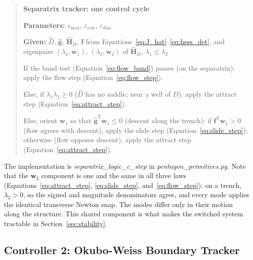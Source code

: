 \documentclass[12pt, letterpaper, oneside]{report}
\begin{document}
\begin{quote}
\textbf{Separatrix tracker: one control cycle}

\textbf{Parameters:} $v_{\max}$, $\varepsilon_{\text{raw}}$, $\varepsilon_{\text{dim}}$

\textbf{Given:} $\hat D$, $\hat{\mathbf{g}}$, $\hat{\mathbf{H}}_D$,
$\mathbf{f}$ from Equations~\eqref{eq:J_hat}--\eqref{eq:hess_det}, and
eigenpairs $(\lambda_1,\mathbf{w}_1)$, $(\lambda_2,\mathbf{w}_2)$ of
$\hat{\mathbf{H}}_D$, $\lambda_1\leq\lambda_2$

If the band test (Equation~\eqref{eq:flow_band}) passes (on the
separatrix): apply the flow step (Equation~\eqref{eq:flow_step}).

Else, if $\lambda_1\lambda_2\geq0$ ($\hat D$ has no saddle; near a well of
$D$): apply the attract step (Equation~\eqref{eq:attract_step}).

Else, orient $\mathbf{w}_1$ so that $\hat{\mathbf{g}}^{\mathsf T}\mathbf{w}_1\leq0$
(descent along the trench): if $\mathbf{f}^{\mathsf T}\mathbf{w}_1>0$
(flow agrees with descent), apply the slide step
(Equation~\eqref{eq:slide_step}); otherwise (flow opposes descent), apply
the attract step (Equation~\eqref{eq:attract_step}).
\end{quote}

The implementation is \textit{separatrix\_logic\_c\_step} in
\textit{pentagon\_primitives.py}. Note that the $\mathbf{w}_2$ component
is one and the same in all three laws
(Equations~\eqref{eq:attract_step}, \eqref{eq:slide_step},
and~\eqref{eq:flow_step}): on a trench, $\lambda_2>0$, so the signed and
magnitude denominators agree, and every mode applies the identical
transverse Newton snap. The modes differ only in their motion along the
structure. This shared component is what makes the switched system
tractable in Section~\ref{sec:stability}.

\subsection{Controller 2: Okubo-Weiss Boundary Tracker}
\label{sec:ow_controller}
\end{document}
